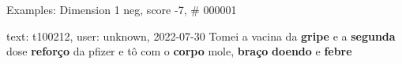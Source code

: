 \begin{frame}{Examples: Dimension 1 neg, score -7, \# 000001}
\footnotesize
\begin{alertblock}{text: t100212, user: unknown, 2022-07-30}
Tomei a vacina da \textbf{gripe} e a \textbf{segunda} dose \textbf{reforço} da 
pfizer e tô com o \textbf{corpo} mole, \textbf{braço} \textbf{doendo} e 
\textbf{febre} \textbf{} 
\end{alertblock}
\end{frame}
